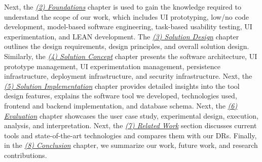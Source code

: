 Next, the \textit{\hyperref[chap:foundations]{(2) Foundations}} chapter is used to gain the knowledge required to understand the scope of our work, which includes UI prototyping, low/no code development, model-based software engineering, task-based usability testing, UI experimentation, and LEAN development.
The \textit{\hyperref[chap:design]{(3) Solution Design}} chapter outlines the design requirements, design principles, and overall solution design. 
Similarly, the \textit{\hyperref[chap:concept]{(4) Solution Concept}} chapter presents the software architecture, UI prototype management, UI experimentation management, persistence infrastructure, deployment infrastructure, and security infrastructure.
Next, the \textit{\hyperref[chap:implementation]{(5) Solution Implementation}} chapter provides detailed insights into the tool design features, explains the software tool we developed, technologies used, frontend and backend implementation, and database schema. 
Next, the \textit{\hyperref[chap:evaluation]{(6) Evaluation}} chapter showcases the user case study, experimental design, execution, analysis, and interpretation. 
Next, the \textit{\hyperref[chap:relatedWork]{(7) Related Work}} section discusses current tools and state-of-the-art technologies and compares them with our DRs.
Finally, in the \textit{\hyperref[chap:conclusion]{(8) Conclusion}} chapter, we summarize our work, future work, and research contributions.
